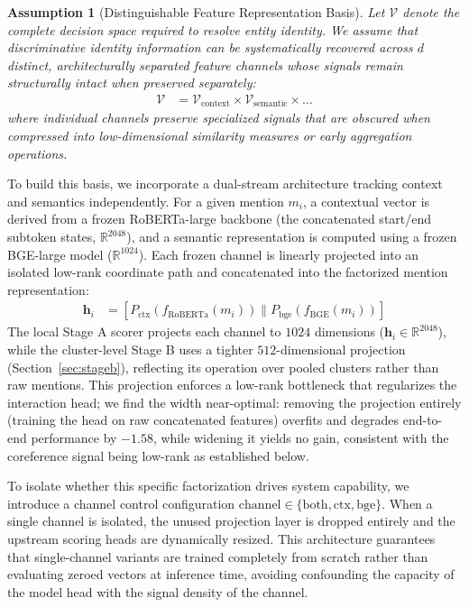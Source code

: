 \documentclass[12pt]{article}
\newtheorem{assumption}{Assumption}
\begin{document}
	\begin{assumption}[Distinguishable Feature Representation Basis]
		Let $\mathcal{V}$ denote the complete decision space required to resolve entity identity. We assume that discriminative identity information can be systematically recovered across $d$ distinct, architecturally separated feature channels whose signals remain structurally intact when preserved separately:
		\begin{align*}
			\mathcal{V} &= \mathcal{V}_{\text{context}} \times \mathcal{V}_{\text{semantic}} \times \dots
		\end{align*}
		where individual channels preserve specialized signals that are obscured when compressed into low-dimensional similarity measures or early aggregation operations.
	\end{assumption}
	
	To build this basis, we incorporate a dual-stream architecture tracking context and semantics independently. For a given mention $m_i$, a contextual vector is derived from a frozen RoBERTa-large backbone (the concatenated start/end subtoken states, $\mathbb{R}^{2048}$), and a semantic representation is computed using a frozen BGE-large model ($\mathbb{R}^{1024}$). Each frozen channel is linearly projected into an isolated low-rank coordinate path and concatenated into the factorized mention representation:
	\begin{align*}
		\mathbf{h}_i &= \left[ P_{\text{ctx}}\left(f_{\text{RoBERTa}}(m_i)\right) \parallel P_{\text{bge}}\left(f_{\text{BGE}}(m_i)\right) \right]
	\end{align*}
	The local Stage A scorer projects each channel to $1024$ dimensions ($\mathbf{h}_i \in \mathbb{R}^{2048}$), while the cluster-level Stage B uses a tighter $512$-dimensional projection (Section~\ref{sec:stageb}), reflecting its operation over pooled clusters rather than raw mentions. This projection enforces a low-rank bottleneck that regularizes the interaction head; we find the width near-optimal: removing the projection entirely (training the head on raw concatenated features) overfits and degrades end-to-end performance by $-1.58$, while widening it yields no gain, consistent with the coreference signal being low-rank as established below.
	
	To isolate whether this specific factorization drives system capability, we introduce a channel control configuration $\text{channel} \in \{\text{both}, \text{ctx}, \text{bge}\}$. When a single channel is isolated, the unused projection layer is dropped entirely and the upstream scoring heads are dynamically resized. This architecture guarantees that single-channel variants are trained completely from scratch rather than evaluating zeroed vectors at inference time, avoiding confounding the capacity of the model head with the signal density of the channel.
	
\end{document}
